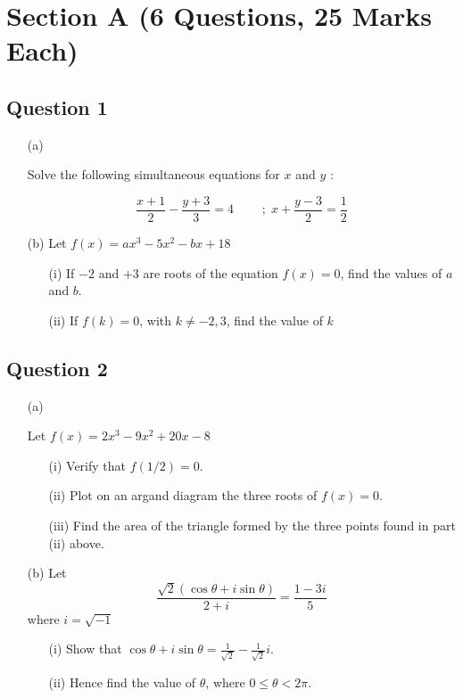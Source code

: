 \documentclass[12pt]{article}
\begin{document}
	
	\setcounter{page}{2}
\section*{Section A (6 Questions, 25 Marks Each)}
\subsection*{Question 1}

\begin{itemize}



\item[(a)]

Solve the following simultaneous equations for $x$ and $y$ :

\[  \frac{x+1}{2} - \frac{y+3}{3} = 4 \; \qquad ;\; x + \frac{y-3}{2} = \frac{1}{2} \]



\item[(b)] Let $f(x) = ax^3 -5x^2 -bx + 18$

\begin{itemize}
	\item[(i)] If $-2$ and $+3$ are roots of the equation $f(x)=0$, find the values of $a$ and $b$.
	\item[(ii)] If $f(k) = 0$, with $k \neq -2,3$, find the value of $k$
\end{itemize}

\end{itemize}

\medskip

\subsection*{Question 2}

\begin{itemize}


\item[(a)]


Let $f(x) = 2x^3 -9x^2 +20x -8$
\begin{itemize}
	\item[(i)] Verify that  $ \displaystyle {f({1 / 2}) = 0}$.
	\item[(ii)] Plot on an argand diagram the three roots of $f(x) = 0$.
	\item[(iii)] Find the area of the triangle formed by the three points found in part (ii) above.
\end{itemize}


\item[(b)] Let $$ \frac{\sqrt{2} \left(\cos \theta + i \sin \theta\right)}{2+i} = \frac{1-3i}{5}$$ where $i = \sqrt{-1}$
\begin{itemize}
	\item[(i)] Show that $\displaystyle \cos \theta + i \sin \theta = \frac{1}{\sqrt{2}} -\frac{1}{\sqrt{2}}i$.
	\item[(ii)] Hence find the value of $\theta$, where $0 \leq \theta <2\pi$.
\end{itemize}

\end{itemize}
\end{document}
